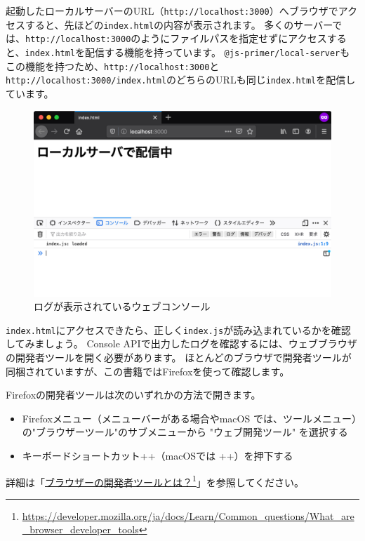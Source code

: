 起動したローカルサーバーのURL（\texttt{http://localhost:3000}）へブラウザでアクセスすると、先ほどの\texttt{index.html}の内容が表示されます。
多くのサーバーでは、\texttt{http://localhost:3000}のようにファイルパスを指定せずにアクセスすると、\texttt{index.html}を配信する機能を持っています。
\texttt{@js-primer/local-server}もこの機能を持つため、\texttt{http://localhost:3000}と\texttt{http://localhost:3000/index.html}のどちらのURLも同じ\texttt{index.html}を配信しています。

\begin{figure}[h]
\centering
\includegraphics[width=120mm]{fig/index.pdf}
\caption{ログが表示されているウェブコンソール}
\end{figure}

\texttt{index.html}にアクセスできたら、正しく\texttt{index.js}が読み込まれているかを確認してみましょう。
Console
APIで出力したログを確認するには、ウェブブラウザの開発者ツールを開く必要があります。
ほとんどのブラウザで開発者ツールが同梱されていますが、この書籍ではFirefoxを使って確認します。

Firefoxの開発者ツールは次のいずれかの方法で開きます。

\begin{itemize}
\item
  Firefoxメニュー（メニューバーがある場合やmacOS
  では、ツールメニュー）の"ブラウザーツール"のサブメニューから "ウェブ開発ツール"
  を選択する
\item
  キーボードショートカット++（macOSでは
  ++）を押下する
\end{itemize}

詳細は「\href{https://developer.mozilla.org/ja/docs/Learn/Common_questions/What_are_browser_developer_tools}{ブラウザーの開発者ツールとは？}\footnote{\url{https://developer.mozilla.org/ja/docs/Learn/Common_questions/What_are_browser_developer_tools}}」を参照してください。

